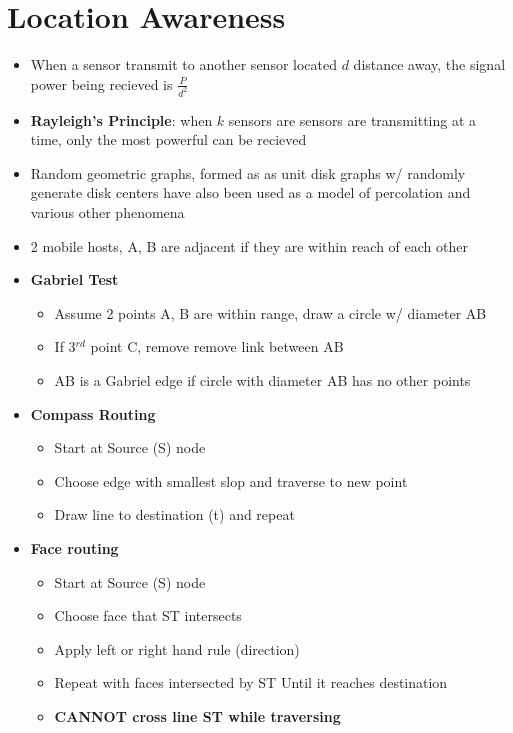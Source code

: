 \documentclass{article}
\begin{document}
    \section{Location Awareness}
    \begin{itemize}
        \item When a sensor transmit to another sensor located $d$ distance away, the signal power being recieved is $\frac{P}{d^2}$
        \item \textbf{Rayleigh's Principle}: when $k$ sensors are sensors are transmitting at a time, only the most powerful can be recieved
        \item Random geometric graphs, formed as as unit disk graphs w/ randomly generate disk centers have also been used as a model of percolation and various other phenomena
        \item 2 mobile hosts, A, B are adjacent if they are within reach of each other
        \item \textbf{Gabriel Test}
        \begin{itemize}
            \item Assume 2 points A, B are within range, draw a circle w/ diameter AB
            \item If 3$^{rd}$ point C, remove remove link between AB
            \item AB is a Gabriel edge if circle with diameter AB has no other points
        \end{itemize}
        \item \textbf{Compass Routing}
        \begin{itemize}
            \item Start at Source (S) node
            \item Choose edge with smallest slop and traverse to new point
            \item Draw line to destination (t) and repeat
        \end{itemize}
        \item \textbf{Face routing}
        \begin{itemize}
            \item Start at Source (S) node
            \item Choose face that ST intersects
            \item Apply left or right hand rule (direction)
            \item Repeat with faces intersected by ST Until it reaches destination
            \item \textbf{CANNOT cross line ST while traversing}
        \end{itemize}
    \end{itemize}
\end{document}
